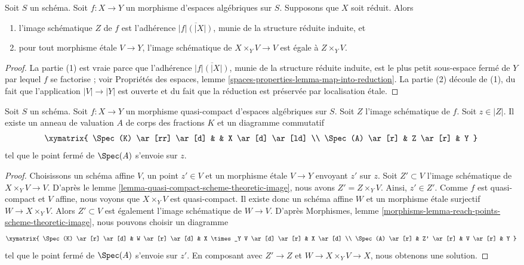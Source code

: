 \begin{lemma}
\label{lemma-scheme-theoretic-image-reduced}
Soit $S$ un schéma. Soit $f : X \to Y$ un morphisme d'espaces algébriques
sur $S$. Supposons que $X$ soit réduit. Alors
\begin{enumerate}
\item l'image schématique $Z$ de $f$ est l'adhérence $\overline{|f|(|X|)}$, munie de la
structure réduite induite, et
\item pour tout morphisme étale $V \to Y$, l'image schématique de
$X \times_Y V \to V$ est égale à $Z \times_Y V$.
\end{enumerate}
\end{lemma}

\begin{proof}
La partie (1) est vraie parce que l'adhérence $\overline{|f|(|X|)}$, munie de la
structure réduite induite, est le plus petit sous-espace fermé
de $Y$ par lequel $f$ se factorise ; voir
Propriétés des espaces, lemme \ref{spaces-properties-lemma-map-into-reduction}.
La partie (2) découle de (1), du fait que l'application $|V| \to |Y|$ est ouverte et du
fait que la réduction est préservée par localisation étale.
\end{proof}

\begin{lemma}
\label{lemma-reach-points-scheme-theoretic-image}
Soit $S$ un schéma.
Soit $f : X \to Y$ un morphisme quasi-compact d'espaces algébriques sur $S$.
Soit $Z$ l'image schématique de $f$.
Soit $z \in |Z|$. Il existe un anneau de valuation $A$ de
corps des fractions $K$ et un diagramme commutatif
$$
\xymatrix{
\Spec(K) \ar[rr] \ar[d] & & X \ar[d] \ar[ld] \\
\Spec(A) \ar[r] & Z \ar[r] & Y
}
$$
tel que le point fermé de $\Spec(A)$ s'envoie sur $z$.
\end{lemma}

\begin{proof}
Choisissons un schéma affine $V$, un point $z' \in V$
et un morphisme étale $V \to Y$ envoyant $z'$ sur $z$.
Soit $Z' \subset V$ l'image schématique de $X \times_Y V \to V$.
D'après le lemme \ref{lemma-quasi-compact-scheme-theoretic-image}, nous avons
$Z' = Z \times_Y V$. Ainsi, $z' \in Z'$.
Comme $f$ est quasi-compact et $V$ affine, nous voyons que
$X \times_Y V$ est quasi-compact. Il existe donc
un schéma affine $W$ et un morphisme étale surjectif
$W \to X \times_Y V$. Alors $Z' \subset V$ est également
l'image schématique de $W \to V$.
D'après Morphismes, lemme \ref{morphisms-lemma-reach-points-scheme-theoretic-image},
nous pouvons choisir un diagramme
$$
\xymatrix{
\Spec(K) \ar[r] \ar[d] &
W \ar[r] \ar[d] &
X \times_Y V \ar[d] \ar[r] &
X \ar[d] \\
\Spec(A) \ar[r] &
Z' \ar[r] &
V \ar[r] &
Y
}
$$
tel que le point fermé de $\Spec(A)$ s'envoie sur $z'$.
En composant avec $Z' \to Z$ et $W \to X \times_Y V \to X$,
nous obtenons une solution.
\end{proof}

